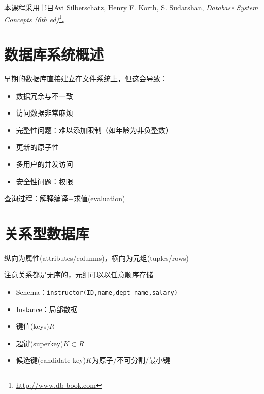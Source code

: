 
本课程采用书目Avi Silberschatz, Henry F. Korth, S. Sudarshan, \emph{Database System Concepts (6th ed)}\footnote{\url{http://www.db-book.com}}。

\section{数据库系统概述}
早期的数据库直接建立在文件系统上，但这会导致：
\begin{itemize}
	\item 数据冗余与不一致
	\item 访问数据非常麻烦
	\item 完整性问题：难以添加限制（如年龄为非负整数）
	\item 更新的原子性
	\item 多用户的并发访问
	\item 安全性问题：权限
\end{itemize}

查询过程：解释编译+求值(evaluation)

\section{关系型数据库}
纵向为属性(attributes/columns)，横向为元组(tuples/rows)

注意关系都是无序的，元组可以以任意顺序存储

\begin{itemize}
	\item Schema：\verb'instructor(ID,name,dept_name,salary)'
	\item Instance：局部数据
	\item 键值(keys)$R$
	\item 超键(superkey)$K\subset R$
	\item 候选键(candidate key)$K$为原子/不可分割/最小键
\end{itemize}

